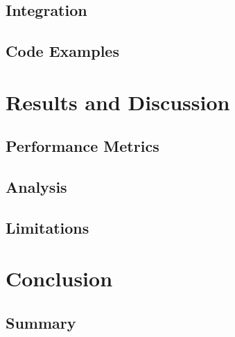 \documentclass[12pt,oneside,a4paper]{article}
\begin{document}
\subsection{Integration}

\subsection{Code Examples}





\section{Results and Discussion} 

\subsection{Performance Metrics}

\subsection{Analysis}

\subsection{Limitations}





\section{Conclusion} 

\subsection{Summary}
\end{document}
